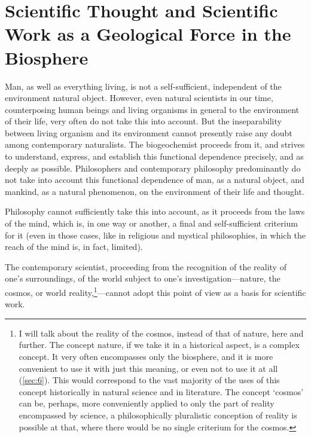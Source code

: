 \part{Scientific Thought and Scientific Work as a Geological Force in the
Biosphere}



\Section %
Man, as well as everything living, is not a self-sufficient, independent of the
environment natural object.  However, even natural scientists in our time,
counterposing human beings and living organisms in general to the environment
of their life, very often do not take this into account.  But the
inseparability between living organism and its environment cannot presently
raise any doubt among contemporary naturalists.  The biogeochemist proceeds
from it, and strives to understand, express, and establish this functional
dependence precisely, and as deeply as possible.  Philosophers and contemporary
philosophy predominantly do not take into account this functional dependence of
man, as a natural object, and mankind, as a natural phenomenon, on the
environment of their life and thought.

Philosophy cannot sufficiently take this into account, as it proceeds from the
laws of the mind, which is, in one way or another, a final and self-sufficient
criterium for it (even in those cases, like in religious and mystical
philosophies, in which the reach of the mind is, in fact, limited).

The contemporary scientist, proceeding from the recognition of the reality of
one's surroundings, of the world subject to one's investigation---nature, the
cosmos, or world reality,\footnote{
	I will talk about the reality of the cosmos, instead of that of nature,
	here and further.  The concept nature, if we take it in a historical
	aspect, is a complex concept.  It very often encompasses only the
	biosphere, and it is more convenient to use it with just this meaning,
	or even not to use it at all (\autoref{sec:6}).  This would correspond
	to the vast majority of the uses of this concept historically in
	natural science and in literature.  The concept `cosmos' can be,
	perhaps, more conveniently applied to only the part of reality
	encompassed by science, a philosophically pluralistic conception of
	reality is possible at that, where there would be no single criterium
	for the cosmos.
}---cannot adopt this point of view as a basis for scientific work.


